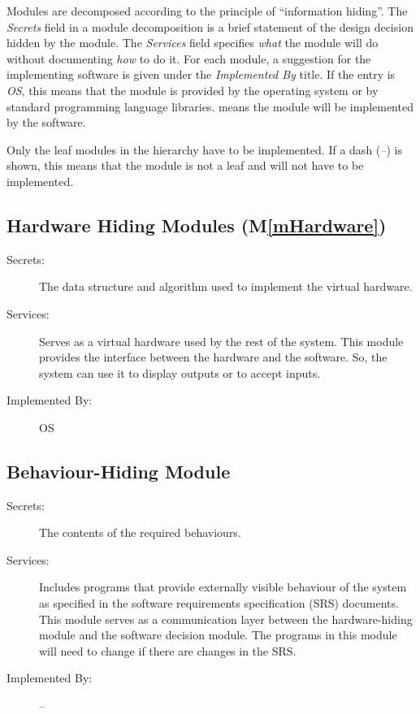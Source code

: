 \documentclass[12pt, titlepage]{article}
\newcommand{\mref}[1]{M\ref{#1}}
\begin{document}
Modules are decomposed according to the principle of ``information hiding''. The \emph{Secrets} field in a module
decomposition is a brief statement of the design decision hidden by the
module. The \emph{Services} field specifies \emph{what} the module will do
without documenting \emph{how} to do it. For each module, a suggestion for the
implementing software is given under the \emph{Implemented By} title. If the
entry is \emph{OS}, this means that the module is provided by the operating
system or by standard programming language libraries.  \emph{\progname{}} means the
module will be implemented by the \progname{} software.

Only the leaf modules in the hierarchy have to be implemented. If a dash
(\emph{--}) is shown, this means that the module is not a leaf and will not have
to be implemented.

\subsection{Hardware Hiding Modules (\mref{mHardware})}

\begin{description}
\item[Secrets:]The data structure and algorithm used to implement the virtual
  hardware.
\item[Services:]Serves as a virtual hardware used by the rest of the
  system. This module provides the interface between the hardware and the
  software. So, the system can use it to display outputs or to accept inputs.
\item[Implemented By:] OS
\end{description}

\subsection{Behaviour-Hiding Module}

\begin{description}
\item[Secrets:]The contents of the required behaviours.
\item[Services:]Includes programs that provide externally visible behaviour of
  the system as specified in the software requirements specification (SRS)
  documents. This module serves as a communication layer between the
  hardware-hiding module and the software decision module. The programs in this
  module will need to change if there are changes in the SRS.
\item[Implemented By:] --
\end{description}
\end{document}
